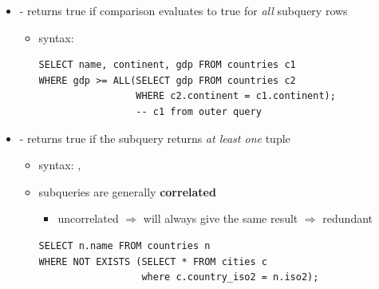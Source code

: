 \documentclass[10pt, landscape]{article}
\begin{document}
\begin{multicols}{3}
\begin{itemize}
    \item {} - returns true if comparison evaluates to true for \textit{all} subquery rows
      \begin{itemize}
        \item syntax: 
          \begin{lstlisting}[style=mySQL]
SELECT name, continent, gdp FROM countries c1
WHERE gdp >= ALL(SELECT gdp FROM countries c2
                 WHERE c2.continent = c1.continent); 
                 -- c1 from outer query
          \end{lstlisting}
      \end{itemize}

    \item {} - returns true if the subquery returns \textit{at least one} tuple
      \begin{itemize}
        \item syntax: , 
        \item {} subqueries are generally \textbf{correlated}
          \begin{itemize}
            \item uncorrelated $\Rightarrow$ will always give the same result $\Rightarrow$ redundant
          \end{itemize}
          \begin{lstlisting}[style=mySQL]
SELECT n.name FROM countries n
WHERE NOT EXISTS (SELECT * FROM cities c
                  where c.country_iso2 = n.iso2);
          \end{lstlisting}
      \end{itemize}



  \end{itemize}


\end{multicols}
\end{document}
